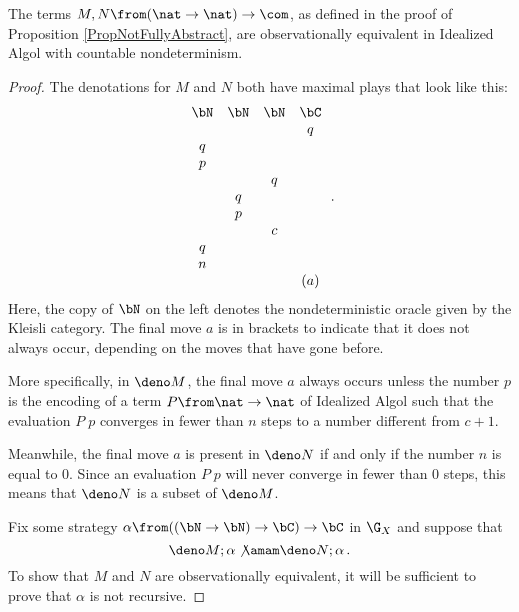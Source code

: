 \begin{lemma}
  The terms $M,N\from (\nat \to \nat) \to \com$, as defined in the proof of Proposition \ref{PropNotFullyAbstract}, are observationally equivalent in Idealized Algol with countable nondeterminism.
\end{lemma}
\begin{proof}
  The denotations for $M$ and $N$ both have maximal plays that look like this:
  \[
    \begin{array}{cccc}
      \bN & \bN & \bN & \bC \\
          &     &     &  q  \\
       q  &     &     &     \\
       p  &     &     &     \\
          &     &  q  &     \\
          &  q  &     &     \\
          &  p  &     &     \\
          &     &  c  &     \\
       q  &     &     &     \\
       n  &     &     &     \\
          &     &     & (a)
    \end{array}\,.
    \]
  Here, the copy of $\bN$ on the left denotes the nondeterministic oracle given by the Kleisli category.  
  The final move $a$ is in brackets to indicate that it does not always occur, depending on the moves that have gone before.

  More specifically, in $\deno M$, the final move $a$ always occurs unless the number $p$ is the encoding of a term $P\from\nat \to \nat$ of Idealized Algol such that the evaluation $P\;p$ converges in fewer than $n$ steps to a number different from $c+1$.

  Meanwhile, the final move $a$ is present in $\deno N$ if and only if the number $n$ is equal to $0$.
  Since an evaluation $P\;p$ will never converge in fewer than $0$ steps, this means that $\deno N$ is a subset of $\deno M$.

  Fix some strategy $\alpha\from ((\bN \to \bN)\to\bC) \to \bC$ in $\G_X$ and suppose that
  \[
    \deno M;\alpha\not\amam \deno N;\alpha\,.
    \]
  To show that $M$ and $N$ are observationally equivalent, it will be sufficient to prove that $\alpha$ is not recursive.


\end{proof}
